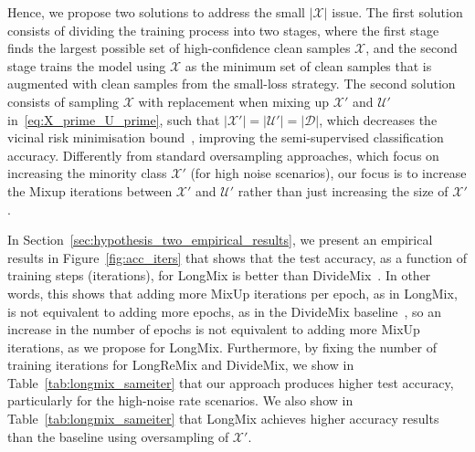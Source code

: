 \documentclass[review]{elsarticle}
\begin{document}
Hence, we propose two solutions to address the small $|\mathcal{X}|$ issue. The first solution consists of dividing the training process into two stages, where the first stage finds the largest possible set of high-confidence clean samples $\mathcal{X}$, and the second stage trains the model using $\mathcal{X}$ as the minimum set of clean samples that is augmented with clean samples from the small-loss strategy. The second solution consists of sampling $\mathcal{X}$
 with replacement when mixing up $\mathcal{X}'$ and $\mathcal{U}'$ in~\eqref{eq:X_prime_U_prime}, such that $|\mathcal{X}'|=|\mathcal{U}'|=|\mathcal{D}|$, which decreases the vicinal risk minimisation bound~\cite{zhang2018generalization}, improving the semi-supervised classification accuracy. Differently from standard oversampling approaches, which focus on increasing the minority class $\mathcal{X}'$ (for high noise scenarios), our focus is to increase the Mixup iterations between $\mathcal{X}'$ and $\mathcal{U}'$ rather than just increasing the size of $\mathcal{X}'$.
 

 
 In Section~\ref{sec:hypothesis_two_empirical_results}, we present an empirical results in Figure~\ref{fig:acc_iters} that shows that the test accuracy, as a function of training steps (iterations), for LongMix is better than DivideMix~\cite{li2020dividemix}. In other words, this shows that adding more MixUp iterations per epoch, as in LongMix, is not equivalent to adding more epochs, as in the DivideMix baseline~\cite{li2020dividemix}, so an  increase in the number of epochs is not equivalent to adding more MixUp iterations, as we propose for LongMix. 
 Furthermore, by fixing the number of training iterations for LongReMix and DivideMix, we show in Table~\ref{tab:longmix_sameiter} that our approach produces higher test accuracy, particularly for the high-noise rate scenarios. We also show in Table~\ref{tab:longmix_sameiter} that LongMix achieves higher accuracy results than the baseline using oversampling of $\mathcal{X}'$.
\end{document}
